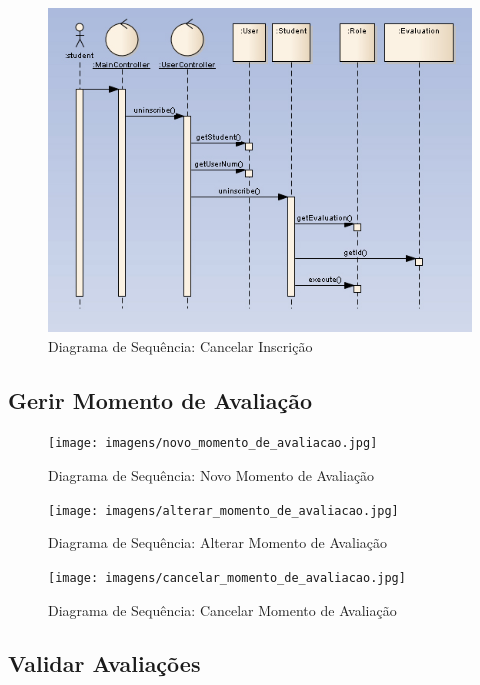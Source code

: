 \begin{figure}[!htbp]
\centering
\includegraphics{imagens/cancelar_inscricao.jpg}
\caption{Diagrama de Sequência: Cancelar Inscrição}
\label{fig:cancelar_inscricao}
\end{figure}

\clearpage
\subsection{Gerir Momento de Avaliação}

\begin{figure}[!htbp]
\centering
\texttt{[image: imagens/novo\_momento\_de\_avaliacao.jpg]}
\caption{Diagrama de Sequência: Novo Momento de Avaliação}
\label{fig:novo_momento_de_avaliacao}
\end{figure}

\begin{figure}[!htbp]
\centering
\texttt{[image: imagens/alterar\_momento\_de\_avaliacao.jpg]}
\caption{Diagrama de Sequência: Alterar Momento de Avaliação}
\label{fig:alterar_momento_de_avaliacao}
\end{figure}

\begin{figure}[!htbp]
\centering
\texttt{[image: imagens/cancelar\_momento\_de\_avaliacao.jpg]}
\caption{Diagrama de Sequência: Cancelar Momento de Avaliação}
\label{fig:cancelar_momento_de_avaliacao}
\end{figure}


\clearpage
\subsection{Validar Avaliações}

